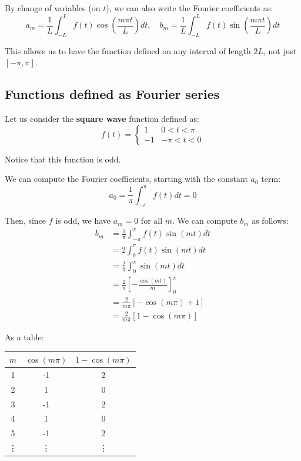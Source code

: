 By change of variables (on $t$), we can also write the Fourier coefficients as:
\begin{equation*}
\boxed{
    a_m = \frac{1}{L} \int_{-L}^{L} f(t) \cos\left( \frac{m \pi t}{L} \right) dt, \quad b_m = \frac{1}{L} \int_{-L}^{L} f(t) \sin\left( \frac{m \pi t}{L} \right) dt
}
\end{equation*}

This allows us to have the function defined on any interval of length $2L$, not just $[-\pi, \pi]$.

\subsection{Functions defined as Fourier series}

Let us consider the \textbf{square wave} function defined as:
\begin{equation*}
f(t) = \begin{cases}
1 & 0 < t < \pi \\
-1 & -\pi < t < 0
\end{cases}
\end{equation*}

Notice that this function is odd.

We can compute the Fourier coefficients, starting with the constant $a_0$ term:
\begin{equation*}
a_0 = \frac{1}{\pi} \int_{-\pi}^{\pi} f(t) dt = 0
\end{equation*}

Then, since $f$ is odd, we have $a_m = 0$ for all $m$. We can compute $b_m$ as follows:
\begin{align*}
b_m &= \frac{1}{\pi} \int_{-\pi}^{\pi} f(t) \sin(mt) dt \\
&= 2 \int_{0}^{\pi} f(t) \sin(mt) dt \\
&= \frac{2}{\pi} \int_{0}^{\pi} \sin(mt) dt \\
&= \frac{2}{\pi} \left[ -\frac{\cos(mt)}{m} \right]_{0}^{\pi} \\
&= \frac{2}{m \pi} \left[ -\cos(m \pi) + 1 \right] \\
&= \frac{2}{m \pi} \left[ 1 - \cos(m \pi) \right] 
\end{align*}

As a table:
\begin{center}
\begin{tabular}{c|c|c}
$m$ & $\cos(m \pi)$ & $1 - \cos(m \pi)$ \\
\hline
1 & -1 & 2 \\
2 & 1 & 0 \\
3 & -1 & 2 \\
4 & 1 & 0 \\
5 & -1 & 2 \\
\vdots & \vdots & \vdots
\end{tabular}
\end{center}

